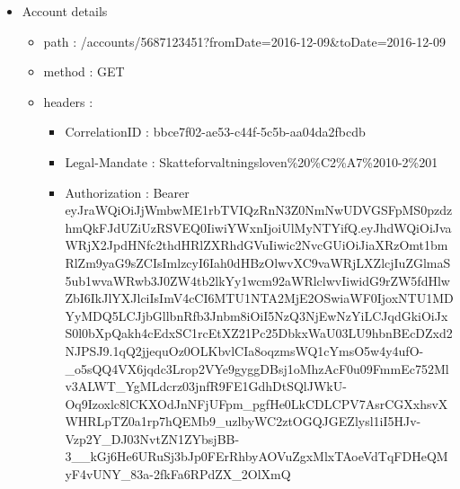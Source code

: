 \documentclass[12pt]{report}
\begin{document}
\begin{itemize}
  \item Account details
  \begin{itemize}
    \item path : /accounts/5687123451?fromDate=2016-12-09&toDate=2016-12-09
    \item method : GET
    \item headers :
    \begin{itemize}
      \item CorrelationID : bbce7f02-ae53-c44f-5c5b-aa04da2fbcdb
      \item Legal-Mandate : Skatteforvaltningsloven\%20\%C2\%A7\%2010-2\%201
      \item Authorization : Bearer eyJraWQiOiJjWmbwME1rbTVIQzRnN3Z0NmNwUDVGSFpMS0pzdzhmQkFJdUZiUzRSVEQ0IiwiYWxnIjoiUlMyNTYifQ.eyJhdWQiOiJvaWRjX2JpdHNfc2thdHRlZXRhdGVuIiwic2NvcGUiOiJiaXRzOmt1bmRlZm9yaG9sZCIsImlzcyI6Iah0dHBzOlwvXC9vaWRjLXZlcjIuZGlmaS5ub1wvaWRwb3J0ZW4tb2lkYy1wcm92aWRlclwvIiwidG9rZW5fdHlwZbI6IkJlYXJlciIsImV4cCI6MTU1NTA2MjE2OSwiaWF0IjoxNTU1MDYyMDQ5LCJjbGllbnRfb3Jnbm8iOiI5NzQ3NjEwNzYiLCJqdGkiOiJxS0l0bXpQakh4cEdxSC1rcEtXZ21Pc25DbkxWaU03LU9hbnBEcDZxd2NJPSJ9.1qQ2jjequOz0OLKbvlCIa8oqzmsWQ1cYmsO5w4y4ufO-\_o5sQQ4VX6jqdc3Lrop2VYe9gyggDBsj1oMhzAcF0u09FmmEc752Mlv3ALWT\_YgMLdcrz03jnfR9FE1GdhDtSQlJWkU-Oq9Izoxlc8lCKXOdJnNFjUFpm\_pgfHe0LkCDLCPV7AsrCGXxhsvXWHRLpTZ0a1rp7hQEMb9\_uzlbyWC2ztOGQJGEZlysl1iI5HJv-Vzp2Y\_DJ03NvtZN1ZYbsjBB-3\_\_kGj6He6URuSj3bJp0FErRhbyAOVuZgxMlxTAoeVdTqFDHeQMyF4vUNY\_83a-2fkFa6RPdZX\_2OlXmQ
    \end{itemize}
  \end{itemize}
\end{itemize}
\end{document}
